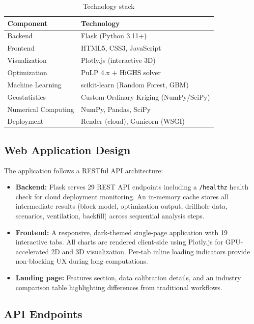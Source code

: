 \documentclass[12pt,a4paper]{article}
\begin{document}
\begin{table}[H]
\centering
\caption{Technology stack}
\begin{tabular}{@{}ll@{}}
\toprule
\textbf{Component} & \textbf{Technology} \\
\midrule
Backend & Flask (Python 3.11+) \\
Frontend & HTML5, CSS3, JavaScript \\
Visualization & Plotly.js (interactive 3D) \\
Optimization & PuLP 4.x + HiGHS solver \\
Machine Learning & scikit-learn (Random Forest, GBM) \\
Geostatistics & Custom Ordinary Kriging (NumPy/SciPy) \\
Numerical Computing & NumPy, Pandas, SciPy \\
Deployment & Render (cloud), Gunicorn (WSGI) \\
\bottomrule
\end{tabular}
\end{table}

\subsection{Web Application Design}

The application follows a RESTful API architecture:

\begin{itemize}[itemsep=0.2em]
    \item \textbf{Backend:} Flask serves 29 REST API endpoints including a \texttt{/healthz} health check for cloud deployment monitoring. An in-memory cache stores all intermediate results (block model, optimization output, drillhole data, scenarios, ventilation, backfill) across sequential analysis steps.
    \item \textbf{Frontend:} A responsive, dark-themed single-page application with 19 interactive tabs. All charts are rendered client-side using Plotly.js for GPU-accelerated 2D and 3D visualization. Per-tab inline loading indicators provide non-blocking UX during long computations.
    \item \textbf{Landing page:} Features section, data calibration details, and an industry comparison table highlighting differences from traditional workflows.
\end{itemize}

\subsection{API Endpoints}
\end{document}
